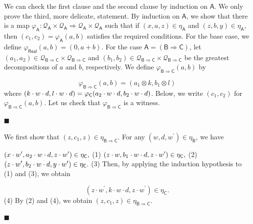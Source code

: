 \documentclass[10pt,a4paper]{amsart}
\begin{document}
We can check the first clause and the second clause by induction on $\mathsf{A}$. We only prove the third, more delicate, statement. By induction on $\mathsf{A}$, we show that there is a map $\varphi_{\mathsf{A}}\colon\mathcal{Q}_{\mathsf{A}}\times\mathcal{Q}_{\mathsf{A%
}}\Rightarrow\mathcal{Q}_{\mathsf{A}}\times\mathcal{Q}_{\mathsf{A}}$ such that if $(x,a,z)\in\eta_{\mathsf{A}}$ and $(z,b,y)\in\eta_{\mathsf{A}}$, then $(c_{1},c_{2})=\varphi_{\mathsf{A}}(a,b)$ satisfies the required conditions. For the base case, we define $\varphi_{\mathsf{Real}}(a,b)=(0,a+b)$. For the case $\mathsf{A}=(\mathsf{B}\Rightarrow\mathsf{C})$, let $(a_{1},a_{2})\in\mathcal{Q}_{\mathsf{B}\Rightarrow\mathsf{C}}\times\mathcal{Q}%
_{\mathsf{B}\Rightarrow\mathsf{C}}$ and $(b_{1},b_{2})\in\mathcal{Q}_{\mathsf{B}\Rightarrow\mathsf{C}}\times\mathcal{Q}%
_{\mathsf{B}\Rightarrow\mathsf{C}}$ be the greatest decompositions of $a$ and $b$, respectively. We define $\varphi_{\mathsf{B}\Rightarrow\mathsf{C}}(a,b)$ by\par
    \[\varphi_{\mathsf{B}\Rightarrow\mathsf{C}}(a,b)=(a_{1}\otimes k,b_{1}\otimes l)\]    
where $(k\cdot w\cdot d,l\cdot w\cdot d)=\varphi_{\mathsf{C}}(a_{2}\cdot w\cdot d,b_{%
2}\cdot w\cdot d)$. Below, we write $(c_{1},c_{2})$ for $\varphi_{\mathsf{B}\Rightarrow\mathsf{C}}(a,b)$. Let us check that $\varphi_{\mathsf{B}\Rightarrow\mathsf{C}}$ is a witness.\par
  
\par\noindent  $\blacksquare$ 
 
We first show that $(z,c_{1},z)\in\eta_{\mathsf{B}\Rightarrow\mathsf{C}}$. For any $(w,d,w^{\prime})\in\eta_{\mathsf{B}}$, we have\par
    $\displaystyle(x\cdot w^{\prime},a_{2}\cdot w\cdot d,z\cdot w^{\prime})\in\eta_%
{\mathsf{C}},$  (1)    $\displaystyle(z\cdot w,b_{1}\cdot w\cdot d,z\cdot w^{\prime})\in\eta_{\mathsf{%
C}},$  (2)    $\displaystyle(z\cdot w^{\prime},b_{2}\cdot w\cdot d,y\cdot w^{\prime})\in\eta_%
{\mathsf{C}}.$  (3)   
Then, by applying the induction hypothesis to (1) and (3), we obtain\par
    \[(z\cdot w^{\prime},k\cdot w\cdot d,z\cdot w^{\prime})\in\eta_{\mathsf{C}}.\]  (4)   
By (2) and (4), we obtain $(z,c_{1},z)\in\eta_{\mathsf{B}\Rightarrow\mathsf{C}}$.\par
 
 
 
\par\noindent  $\blacksquare$ 
 
\end{document}
